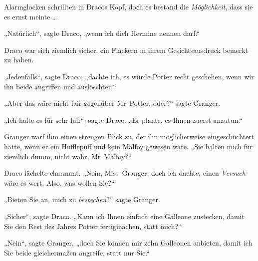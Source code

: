 Alarmglocken schrillten in Dracos Kopf, doch es bestand die \emph{Möglichkeit}, dass sie es ernst meinte …

„Natürlich“, sagte Draco, „wenn ich dich Hermine nennen darf.“

Draco war sich ziemlich sicher, ein Flackern in ihrem Gesichtsausdruck bemerkt zu haben.

„Jedenfalls“, sagte Draco, „dachte ich, es würde Potter recht geschehen, wenn wir ihn beide angriffen und auslöschten.“

„Aber das wäre nicht fair gegenüber Mr~Potter, oder?“ sagte Granger.

„Ich halte es für sehr fair“, sagte Draco.
„Er plante, es Ihnen zuerst anzutun.“

Granger warf ihm einen strengen Blick zu, der ihn möglicherweise eingeschüchtert hätte, wenn er ein Hufflepuff und kein Malfoy gewesen wäre.
„Sie halten mich für ziemlich dumm, nicht wahr, Mr~Malfoy?“

Draco lächelte charmant.
„Nein, Miss~Granger, doch ich dachte, einen \emph{Versuch} wäre es wert. Also, was wollen Sie?“

„Bieten Sie an, mich zu \emph{bestechen}?“ sagte Granger.

„Sicher“, sagte Draco.
„Kann ich Ihnen einfach eine Galleone zustecken, damit Sie den Rest des Jahres Potter fertigmachen, statt mich?“

„Nein“, sagte Granger, „doch Sie können mir zehn Galleonen anbieten, damit ich Sie beide gleichermaßen angreife, statt nur Sie.“

